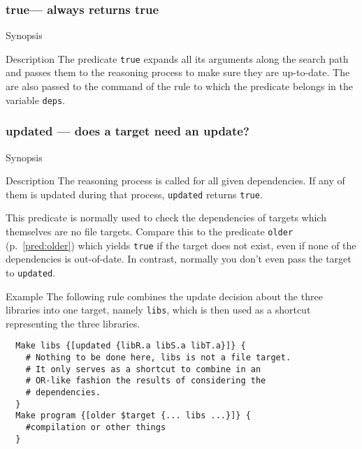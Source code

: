 \documentclass[11pt]{scrartcl}
\begin{document}
\subsubsection{true--- always returns true}
\begin{Describe}
\item[Synopsis]  
\item[Description] The predicate \texttt{true} expands all its
  arguments along the search path and passes them to the reasoning
  process to make sure they are up-to-date. The are also passed to the
  command of the rule to which the predicate belongs in the variable
  \texttt{deps}.
\end{Describe}

\subsubsection{updated --- does a target need an update?}

\label{pred:updated}
\begin{Describe}
\item[Synopsis]  
\item[Description] The reasoning process is called for all given
  dependencies. If any of them is updated during that process,
  \texttt{updated} returns \texttt{true}. 
  
  This predicate is normally used to check the dependencies of targets
  which themselves are no file targets. Compare this to the predicate
  \texttt{older} (p.~\ref{pred:older}) which yields \texttt{true} if
  the target does not exist, even if none of the dependencies is
  out-of-date. In contrast, normally you don't even pass the target to
  \texttt{updated}.
  
\item[Example] The following rule combines the update decision about
  the three libraries into one target, namely \texttt{libs}, which is
  then used as a shortcut representing the three libraries.
\begin{verbatim}
  Make libs {[updated {libR.a libS.a libT.a}]} {
    # Nothing to be done here, libs is not a file target. 
    # It only serves as a shortcut to combine in an 
    # OR-like fashion the results of considering the 
    # dependencies.
  }
  Make program {[older $target {... libs ...}]} {
    #compilation or other things
  }
\end{verbatim}

\end{Describe}
\end{document}
